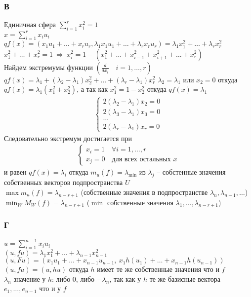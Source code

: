 \subsubsection*{\textbf{В}}
Единичная сфера $\sum\limits^{r}_{i=1} x^2_i = 1$\\
$x = \sum\limits^{r}_{i=1} x_i u_i$\\
$qf(x) = (x_1 u_1 + \ldots + x_r u_r, \lambda_1 x_1 u_1 + \ldots + \lambda_r x_r u_r) = \lambda_1 x^2_1 + \ldots + \lambda_r x^2_r$\\
$x^2_1 + \ldots + x^2_r = 1\ \Rightarrow\ x^2_i = 1 - (x_1^2 + \ldots + x^2_{i-1} + x^2_{i+1} + \ldots + x^2_r)$\\
Найдем экстремумы функции $(\frac{d}{dx_i}\quad i = 1, \ldots, r)$\\
$qf(x) = \lambda_1 + (\lambda_2 - \lambda_1)x^2_2 + \ldots + (\lambda_r - \lambda_1)x^2_r$
$\lambda_2 = \lambda_1$ или $x_2 = 0$ откуда $qf(x) = \lambda_1 (x^2_1 + x^2_2)$, а так как $x^2_1 = 1 - x^2_2$ откуда $qf(x) = \lambda_1$
\begin{gather*}
	\begin{cases}
		2(\lambda_2 - \lambda_1)x_2 = 0\\
		2(\lambda_3 - \lambda_1)x_3 = 0\\
		\ldots\\
		2(\lambda_r - \lambda_1)x_r = 0
	\end{cases}
\end{gather*}
Следовательно экстремум достигается при 
\begin{gather*}
	\begin{cases}
		x_i = 1\quad \forall i = 1, \ldots, r\\
		x_j = 0\quad \text{для всех остальных } x
	\end{cases}
\end{gather*}
и равен $qf(x) = \lambda_i$ откуда $m_u(f) = \lambda_{\min}$ из $\lambda_j$ -- собстенные значения собственных векторов подпространства $U$\\
$\max m_u(f) = \lambda_{n-r+1}$ (собственные значения в подпространстве $\lambda_n, \lambda_{n-1}, \ldots$)\\
$\min_W M_W (f) = \lambda_{n-r+1}$ ($\min$ собственные значения $\lambda_1, \ldots, \lambda_{n-r+1}$)
	
		
\subsubsection*{\textbf{Г}}
$u = \sum\limits^{n-1}_{i = 1} x_i u_i$\\
$(u, fu) = \lambda_1 x^2_1 + \ldots + \lambda_{n-1} x^2_{n-1}$\\
$(u, Fu) = (x_1 u _1 + \ldots + x_{n-1} u_{n-1},\ x_1 h(u_1) + \ldots + x_{n-1} h(u_{n-1}))$\\
$(u, fu) = (u, hu)$ откуда $h$ имеет те же собственные значения что и $f$\\
$\lambda_{n}$ значение у $h$: либо 0, либо $-\lambda_{n}$, так как у $h$ те же базисные вектора $e_1, \ldots, e_{n-1}$ что и у $f$ 
	
